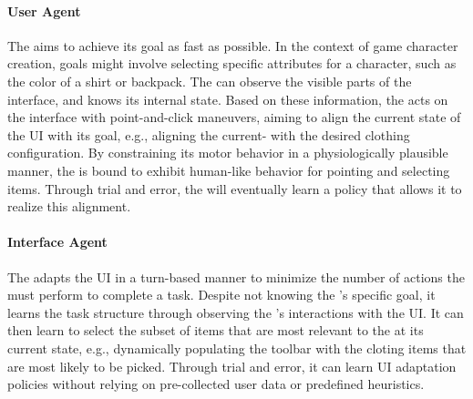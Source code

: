 \paragraph*{User Agent}
The \useragent aims to achieve its goal as fast as possible. In the context of game character creation, goals might involve selecting specific attributes for a character, such as the color of a shirt or backpack. The \useragent can observe the visible parts of the interface, and knows its internal state. Based on these information, the \useragent acts on the interface with point-and-click maneuvers, aiming to align the current state of the UI with its goal, e.g., aligning the current- with the desired clothing configuration. 
By constraining its motor behavior in a physiologically plausible manner, the \useragent is bound to exhibit human-like behavior for pointing and selecting items.
Through trial and error, the \useragent will eventually learn a policy that allows it to realize this alignment.

\paragraph*{Interface Agent}
The \interfaceagent adapts the UI in a turn-based manner to minimize the number of actions the \useragent must perform to complete a task. Despite not knowing the \useragent's specific goal, it learns the task structure  through observing the \useragent's interactions with the UI. 
It can then learn to select the subset of items that are most relevant to the \useragent at its current state, e.g., dynamically populating the toolbar with the cloting items that are most likely to be picked.
Through trial and error, it can learn UI adaptation policies without relying on pre-collected user data or predefined heuristics.


